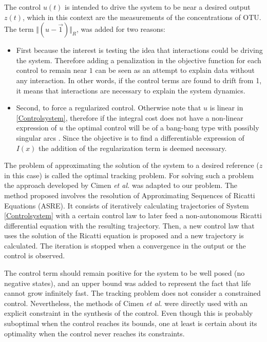 \documentclass[3p,times]{article}
\begin{document}
The control $u(t)$ is intended to drive the system to be near a desired output $z(t)$, which in this context are the measurements of the concentrations of OTU. The term $\Vert(u -\vec{1}) \Vert_R$, was added for two reasons:
\begin{itemize}
\item First because the interest is testing the idea that interactions could be driving the system. Therefore adding a penalization in the objective function for each control to remain near $1$ can be seen as an attempt to explain data without any interaction. In other words, if the control terms are found to drift from 1, it means that interactions are necessary to explain the system dynamics.

\item Second, to force a regularized control. Otherwise note that $u$ is linear in \eqref{Controlsystem}, therefore if the integral cost does not have a non-linear expression of $u$ the optimal control will be of a bang-bang type with possibly singular arcs \cite{harmand2019optimal}. Since the objective is to find a differentiable expression of $I(x)$ the addition of the regularization term is deemed necessary.
\end{itemize} 
The problem of approximating the solution of the system to a desired reference ($z$ in this case) is called the optimal tracking problem. For solving such a problem the approach developed by Cimen \textit{et al.} \cite{Cimen2004, Cimen2008} was adapted to our problem. The method proposed involves the resolution of Approximating Sequences of Ricatti Equations (ASRE). It consists of iteratively calculating trajectories of System \eqref{Controlsystem} with a certain control law to later feed a non-autonomous Ricatti differential equation with the resulting trajectory. Then, a new control law that uses the solution of the Ricatti equation is proposed and a new trajectory is calculated. The iteration is stopped when a convergence in the output or  the control is observed.

The control term should remain positive for the system to be well posed (no negative states), and an upper bound was added to represent the fact that life cannot grow infinitely fast. The tracking problem does not consider a constrained control. Nevertheless, the methods of Cimen \textit{et al.}\cite{Cimen2004} were directly used with an explicit constraint in the synthesis of the control. Even though this is probably suboptimal when the control reaches its bounds, one at least is certain about its optimality when the control never reaches its constraints.
\end{document}
